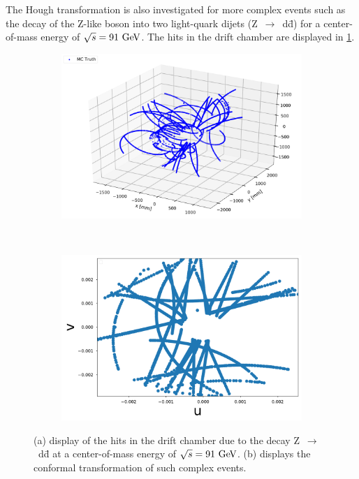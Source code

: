 The Hough transformation is also investigated for more complex events such as the decay of the Z-like boson into two light-quark dijets (Z~$\rightarrow$~d\={d}) for a center-of-mass energy of $\sqrt{s} = 91 \,\mathrm{\,Ge\kern -0.1em V}$.
The hits in the drift chamber are displayed in \cref{fig_Zdd}.

\begin{figure}[ht]
	\centering
	\begin{subfigure}[b]{0.48\textwidth}
        \includegraphics[width=\textwidth]{figures/3D_Zdd.pdf}
        \caption{}
    \end{subfigure}
		~ %
		\begin{subfigure}[b]{0.48\textwidth}
					\includegraphics[width=\textwidth]{figures/CT_Zdd.pdf}
					\caption{}
			\end{subfigure}
	\caption{(a) display of the hits in the drift chamber due to the decay Z~$\rightarrow$~d\={d} at a center-of-mass energy of $\sqrt{s} = 91 \,\mathrm{\,Ge\kern -0.1em V}$. (b) displays the conformal transformation of such complex events.}
	\label{fig_Zdd}
\end{figure}

